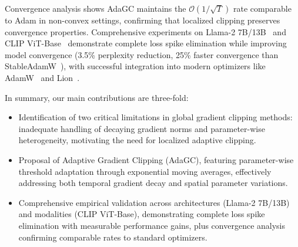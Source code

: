 Convergence analysis shows AdaGC maintains the $\mathcal{O}(1/\sqrt{T})$ rate comparable to Adam in non-convex settings, confirming that localized clipping preserves convergence properties. Comprehensive experiments on Llama-2 7B/13B~\cite{touvron2023llama} and CLIP ViT-Base~\cite{radford2021learning} demonstrate complete loss spike elimination while improving model convergence (3.5\% perplexity reduction, 25\% faster convergence than StableAdamW~\cite{wortsman2023stable}), with successful integration into modern optimizers like AdamW~\cite{loshchilov2017decoupled} and Lion~\cite{chen2024symbolic}.

In summary, our main contributions are three-fold:
\begin{itemize}

    \item Identification of two critical limitations in global gradient clipping methods: inadequate handling of decaying gradient norms and parameter-wise heterogeneity, motivating the need for localized adaptive clipping.
    \item Proposal of Adaptive Gradient Clipping (AdaGC), featuring parameter-wise threshold adaptation through exponential moving averages, effectively addressing both temporal gradient decay and spatial parameter variations.
    \item Comprehensive empirical validation across architectures (Llama-2 7B/13B) and modalities (CLIP ViT-Base), demonstrating complete loss spike elimination with measurable performance gains, plus convergence analysis confirming comparable rates to standard optimizers.
\end{itemize}
